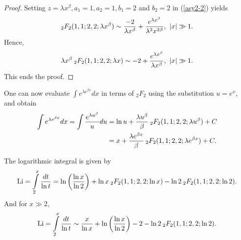\documentclass[smallextended]{svjour3}
\begin{document}
\begin{proof}
Setting $z=\lambda x^\beta, a_1=1, a_2=1, b_1=2$ and $b_2=2$ in (\ref{asy2-2}) yields
\begin{equation}
_{2}F_{2}(1,1;2,2;\lambda x^\beta)\sim\frac{-2}{\lambda x^\beta}+\frac{e^{\lambda x^\beta}}{\lambda^2 x^{2\beta}}, \hspace{.12cm} |x|\gg1.
\end{equation}
Hence,
\begin{equation}
\lambda x^\beta \hspace{.075cm} _{2}F_{2}(1,1;2,2;\lambda x)\sim-2+\frac{e^{\lambda x^\beta}}{\lambda x^\beta}, \hspace{.12cm} |x|\gg1.
\end{equation}
This ends the proof.
\end{proof}
\begin{example}
One can now evaluate $\int e^{\lambda e^{\beta x}}dx$ in terms of $_{2}F_{2}$ using the substitution $u=e^x$, and obtain
\begin{align}
\int e^{\lambda e^{\beta x} }dx=\int \frac{e^{\lambda u^\beta}}{u} du&=\ln{u}+ \frac{\lambda u^\beta}{\beta}\hspace{.075cm}   _{2}F_{2}(1,1;2,2; \lambda u^\beta)+C\nonumber \\ &=x+ \frac{\lambda e^{\beta x}}{\beta}\hspace{.075cm}   _{2}F_{2}(1,1;2,2; \lambda e^{\beta x})+C.
\label{ex6-1}
\end{align}
\label{ex6}
\end{example}

\begin{theorem} The logarithmic integral is given by
\begin{multline}
\text{Li}=\int\limits_2^x\frac{dt}{\ln{t}}=\ln{\left(\frac{\ln{x}}{\ln{2}}\right)}+\ln{x}\hspace{.075cm} _{2}F_{2}(1,1;2,2;\ln{x})-
\ln{2}\hspace{.075cm} _{2}F_{2}(1,1;2,2;\ln{2}).
\label{Thm5-1}
\end{multline}
And for $x\gg2$,
\begin{equation}
\text{Li}=\int\limits_{2}^{x}\frac{dt}{\ln{t}}\sim \frac{x}{\ln{x}}+\ln{\left(\frac{\ln{x}}{\ln{2}}\right)}-2-
\ln{2}\hspace{.075cm} _{2}F_{2}(1,1;2,2;\ln{2}).
\label{Thm5-2}
\end{equation}
\label{Thm5}
\end{theorem}
\end{document}
